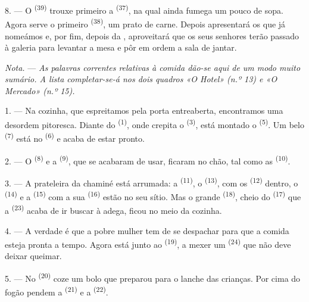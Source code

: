 8. --- O  \textsuperscript{(39)} trouxe primeiro a 
\textsuperscript{(37)}, na qual ainda fumega um pouco de sopa. Agora serve o
primeiro  \textsuperscript{(38)}, um prato de carne. Depois
apresentará os que já nomeámos e, por fim, depois da ,
aproveitará que os seus senhores terão passado à galeria para levantar a
mesa e pôr em ordem a sala de jantar.

\textit{Nota.} --- \textit{As palavras correntes relativas à comida
dão-se aqui de um modo muito sumário. A lista completar-se-á nos dois
quadros «O Hotel» (n.º 13) e «O Mercado» (n.º 15).}

\VUsaut{4.6mm}
\VUsaut{3.0mm}

1. --- Na cozinha, que espreitamos pela porta
entreaberta, encontramos uma desordem pitoresca. Diante do  \textsuperscript{(1)}, onde crepita o  \textsuperscript{(3)}, está
montado o  \textsuperscript{(5)}. Um belo 
\textsuperscript{(7)} está no  \textsuperscript{(6)} e acaba de estar
pronto.

2. --- O  \textsuperscript{(8)} e a 
\textsuperscript{(9)}, que se acabaram de usar, ficaram no chão, tal como as
 \textsuperscript{(10)}.

3. --- A prateleira da chaminé está arrumada: a 
\textsuperscript{(11)}, o  \textsuperscript{(13)}, com os
 \textsuperscript{(12)} dentro, o 
\textsuperscript{(14)} e a  \textsuperscript{(15)} com a sua
 \textsuperscript{(16)} estão no seu sítio. Mas o grande
 \textsuperscript{(18)}, cheio do 
\textsuperscript{(17)} que a  \textsuperscript{(23)} acaba de ir
buscar à adega, ficou no meio da cozinha.

4. --- A verdade é que a pobre mulher tem de se despachar para que a
comida esteja pronta a tempo. Agora está junto ao 
\textsuperscript{(19)}, a mexer um  \textsuperscript{(24)} que não deve
deixar queimar.

5. --- No  \textsuperscript{(20)} coze um bolo que preparou para o
lanche das crianças. Por cima do fogão pendem a 
\textsuperscript{(21)} e a  \textsuperscript{(22)}.

